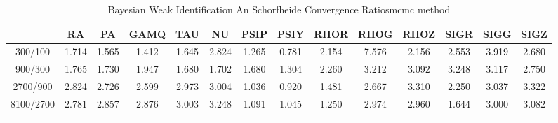 \documentclass[a4paper,10pt]{article}
\begin{document}
\centering
\begin{longtable}{cccccccccccccc}
\toprule
 & RA & PA & GAMQ & TAU & NU & PSIP & PSIY & RHOR & RHOG & RHOZ & SIGR & SIGG & SIGZ \\
\midrule
300/100 & 1.714 & 1.565 & 1.412 & 1.645 & 2.824 & 1.265 & 0.781 & 2.154 & 7.576 & 2.156 & 2.553 & 3.919 & 2.680 \\
900/300 & 1.765 & 1.730 & 1.947 & 1.680 & 1.702 & 1.680 & 1.304 & 2.260 & 3.212 & 3.092 & 3.248 & 3.117 & 2.750 \\
2700/900 & 2.824 & 2.726 & 2.599 & 2.973 & 3.004 & 1.036 & 0.920 & 1.481 & 2.667 & 3.310 & 2.250 & 3.037 & 3.322 \\
8100/2700 & 2.781 & 2.857 & 2.876 & 3.003 & 3.248 & 1.091 & 1.045 & 1.250 & 2.974 & 2.960 & 1.644 & 3.000 & 3.082 \\
\bottomrule
\caption{Bayesian Weak Identification An Schorfheide Convergence Ratiosmcmc method}
\label{table:tbl:WeakAnSchoConvergenceRatios_mcmc}
\end{longtable}
\end{document}
